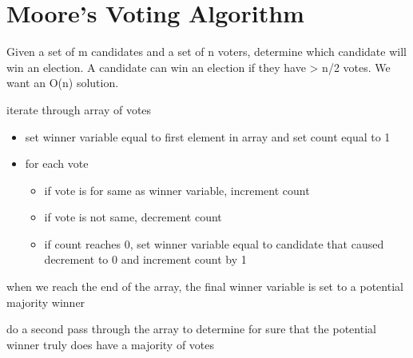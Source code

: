 \section{Moore's Voting Algorithm}
Given a set of m candidates and a set of n voters, determine which candidate will win an election. A candidate can win an election if they have > n/2 votes. We want an O(n) solution. 

\algorithm
{
    \item iterate through array of votes
    \begin{itemize}
        \item set winner variable equal to first element in array and set count equal to 1
        \item for each vote 
        \begin{itemize}
            \item if vote is for same as winner variable, increment count
            \item if vote is not same, decrement count
            \item if count reaches 0, set winner variable equal to candidate that caused decrement to 0 and increment count by 1
        \end{itemize}
    \end{itemize}
    \item when we reach the end of the array, the final winner variable is set to a potential majority winner
    \item do a second pass through the array to determine for sure that the potential winner truly does have a majority of votes
}

